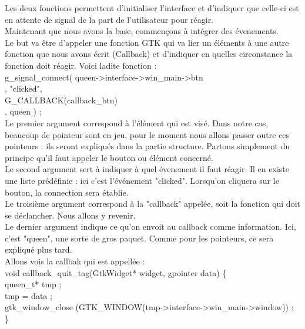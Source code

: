 \documentclass[11pt,french,a4paper]{report}
\begin{document}
Les deux fonctions permettent d'initialiser l'interface et d'indiquer que celle-ci est en attente de signal
de la part de l'utilisateur pour réagir. \\

Maintenant que nous avons la base, commençons à intégrer des évenements. \\
Le but va être d'appeler une fonction GTK qui va lier un éléments à une autre fonction que nous avons écrit  (Callback) 
et d'indiquer en quelles circonstance la fonction doit réagir. Voici ladite fonction : \\

g\_signal\_connect( queen->interface->win\_main->btn \\,
                   "clicked", \\
                    G\_CALLBACK(callback\_btn) \\,
                    queen ) ; \\

Le premier argument correspond à l'élément qui est visé. Dans notre cas, beaucoup de pointeur sont en jeu,
pour le moment nous allons passer outre ces pointeurs : ils seront expliqués dans la partie structure. 
Partons simplement du principe qu'il faut appeler le bouton ou élément concerné.  \\

Le second argument sert à indiquer à quel évenement il faut réagir. Il en existe une liste prédéfinie : ici
c'est l'événement "clicked". Lorsqu'on cliquera sur le bouton, la connection sera établie. \\

Le troisième argument correspond à la "callback" appelée, soit la fonction qui doit se déclancher. Nous allons 
y revenir. \\

Le dernier argument indique ce qu'on envoit au callback comme information. Ici, c'est "queen", une sorte de 
gros paquet. Comme pour les pointeurs, ce sera expliqué plus tard. \\


Allons vois la callbak qui est appellée : \\

void callback\_quit\_tag(GtkWidget* widget, gpointer data) \{ \\                                      
    queen\_t* tmp ; \\                                                                             
    tmp = data ; \\                                                                               
    gtk\_window\_close (GTK\_WINDOW(tmp->interface->win\_main->window)) ; \\
\} \\
\end{document}
